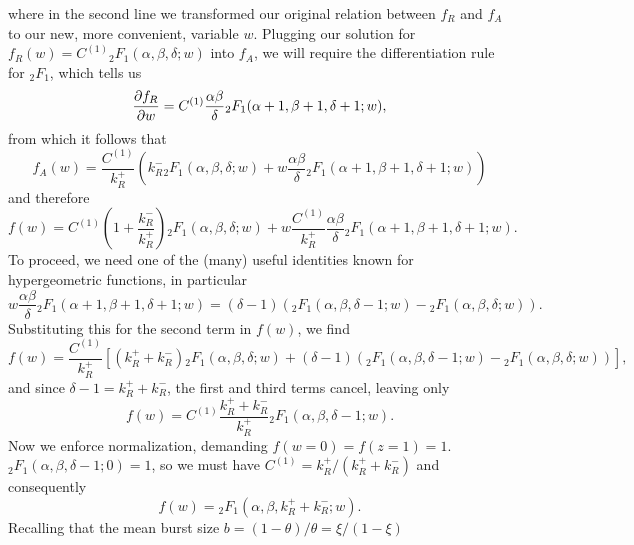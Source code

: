 where in the second line we transformed our original relation between
$f_R$ and $f_A$ to our new, more convenient, variable $w$.
Plugging our solution for $f_R(w) = C^{(1)}{_2F_1}(\alpha, \beta, \delta; w)$
into $f_A$, we will require the differentiation rule for ${_2F_1}$,
which tells us
\begin{equation}
\pderiv[f_R]{w} = C^{(1)}\frac{\alpha\beta}{\delta}
                {_2F_1}(\alpha+1, \beta+1, \delta+1; w),
\end{equation}
from which it follows that
\begin{equation}
f_A(w) = \frac{C^{(1)}}{k_R^+}
\left(
k_R^- {_2F_1}(\alpha, \beta, \delta; w)
+ w\frac{\alpha\beta}{\delta} {_2F_1}(\alpha+1, \beta+1, \delta+1; w)
\right)
\end{equation}
and therefore
\begin{equation}
f(w) = C^{(1)}\left(1 + \frac{k_R^-}{k_R^+}\right)
        {_2F_1}(\alpha, \beta, \delta; w)
+ w \frac{C^{(1)}}{k_R^+} \frac{\alpha\beta}{\delta}
        {_2F_1}(\alpha+1, \beta+1, \delta+1; w).
\end{equation}
To proceed, we need one of the (many) useful identities known for
hypergeometric functions, in particular
\begin{equation}
w\frac{\alpha\beta}{\delta} {_2F_1}(\alpha+1, \beta+1, \delta+1; w)
=
(\delta-1)\left(
{_2F_1}(\alpha, \beta, \delta-1; w) - {_2F_1}(\alpha, \beta, \delta; w)
\right).
\end{equation}
Substituting this for the second term in $f(w)$, we find
\begin{equation}
f(w) = \frac{C^{(1)}}{k_R^+}
\left[
        \left(k_R^+ + k_R^-\right)
        {_2F_1}(\alpha, \beta, \delta; w)
+ (\delta-1)\left(
        {_2F_1}(\alpha, \beta, \delta-1; w) - {_2F_1}(\alpha, \beta, \delta; w)
        \right)
\right],
\end{equation}
and since $\delta-1 = k_R^+ + k_R^-$, the first and third terms cancel,
leaving only
\begin{equation}
f(w) = C^{(1)}\frac{k_R^+ + k_R^-}{k_R^+} {_2F_1}(\alpha, \beta, \delta-1; w).
\end{equation}
Now we enforce normalization, demanding $f(w=0) = f(z=1) = 1$.
${_2F_1}(\alpha, \beta, \delta-1; 0) = 1$, so we must have
$C^{(1)} = k_R^+ / (k_R^+ + k_R^-)$ and consequently
\begin{equation}
f(w) =  {_2F_1}(\alpha, \beta, k_R^+ + k_R^-; w).
\end{equation}
Recalling that the mean burst size $b = (1-\theta)/\theta = \xi/(1-\xi)$
